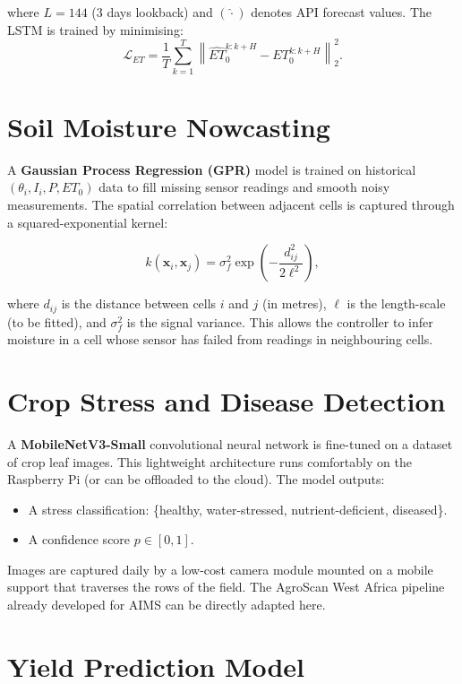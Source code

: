 \documentclass[12pt, a4paper]{report}
\begin{document}
where $L=144$ (3 days lookback) and $(\hat{\cdot})$ denotes API forecast values. The LSTM is trained by minimising:
\begin{equation}
  \mathcal{L}_{ET} = \frac{1}{T}\sum_{k=1}^T \left\|\widehat{ET}_0^{k:k+H} - ET_0^{k:k+H}\right\|_2^2.
\end{equation}

\section{Soil Moisture Nowcasting}

A \textbf{Gaussian Process Regression (GPR)} model is trained on historical $(\theta_i, I_i, P, ET_0)$ data to fill missing sensor readings and smooth noisy measurements. The spatial correlation between adjacent cells is captured through a squared-exponential kernel:

\begin{equation}
  k(\mathbf{x}_i, \mathbf{x}_j) = \sigma_f^2 \exp\!\left(-\frac{d_{ij}^2}{2\ell^2}\right),
\end{equation}

where $d_{ij}$ is the distance between cells $i$ and $j$ (in metres), $\ell$ is the length-scale (to be fitted), and $\sigma_f^2$ is the signal variance. This allows the controller to infer moisture in a cell whose sensor has failed from readings in neighbouring cells.

\section{Crop Stress and Disease Detection}

A \textbf{MobileNetV3-Small} convolutional neural network is fine-tuned on a dataset of crop leaf images. This lightweight architecture runs comfortably on the Raspberry Pi (or can be offloaded to the cloud). The model outputs:
\begin{itemize}[leftmargin=2em]
  \item A stress classification: \{healthy, water-stressed, nutrient-deficient, diseased\}.
  \item A confidence score $p \in [0,1]$.
\end{itemize}

Images are captured daily by a low-cost camera module mounted on a mobile support that traverses the rows of the field. The AgroScan West Africa pipeline already developed for AIMS can be directly adapted here.

\section{Yield Prediction Model}
\end{document}
